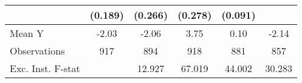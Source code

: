 {\begin{tabular}{l*{5}{c}}
            &     (0.189)         &     (0.266)         &     (0.278)         &     (0.091)         &                     \\
\midrule
Mean Y      &       -2.03         &       -2.06         &        3.75         &        0.10         &       -2.14         \\
Observations&         917         &         894         &         918         &         881         &         857         \\
Exc. Inst. F-stat&                     &      12.927         &      67.019         &      44.002         &      30.283         \\
\bottomrule
\end{tabular}
}
